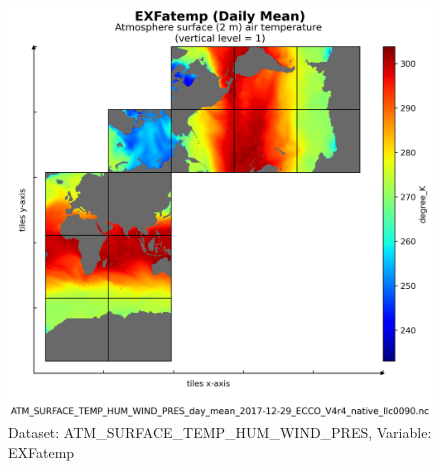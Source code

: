 \begin{figure}[H]
\centering
\includegraphics[scale=0.55]{../images/plots/v4r4/native_plots/Atmosphere_Surface_Temperature_Humidity_Wind_and_Pressure/EXFatemp.png}
\caption{Dataset: ATM\_SURFACE\_TEMP\_HUM\_WIND\_PRES, Variable: EXFatemp}
\label{tab:table-ATM_SURFACE_TEMP_HUM_WIND_PRES_EXFatemp-Plot}
\end{figure}
\newpage
\pagebreak
